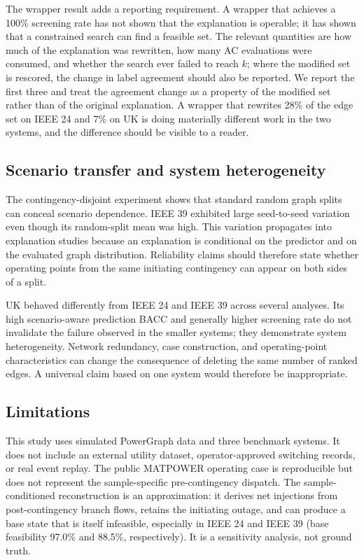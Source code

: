 The wrapper result adds a reporting requirement. A wrapper that achieves a 100\% screening rate has not shown that the explanation is operable; it has shown that a constrained search can find a feasible set. The relevant quantities are how much of the explanation was rewritten, how many AC evaluations were consumed, and whether the search ever failed to reach $k$; where the modified set is rescored, the change in label agreement should also be reported. We report the first three and treat the agreement change as a property of the modified set rather than of the original explanation. A wrapper that rewrites 28\% of the edge set on IEEE 24 and 7\% on UK is doing materially different work in the two systems, and the difference should be visible to a reader.

\subsection{Scenario transfer and system heterogeneity}\label{scenario_transfer_is_part_of_reliability_evidence}

The contingency-disjoint experiment shows that standard random graph splits can conceal scenario dependence. IEEE 39 exhibited large seed-to-seed variation even though its random-split mean was high. This variation propagates into explanation studies because an explanation is conditional on the predictor and on the evaluated graph distribution. Reliability claims should therefore state whether operating points from the same initiating contingency can appear on both sides of a split.

UK behaved differently from IEEE 24 and IEEE 39 across several analyses. Its high scenario-aware prediction BACC and generally higher screening rate do not invalidate the failure observed in the smaller systems; they demonstrate system heterogeneity. Network redundancy, case construction, and operating-point characteristics can change the consequence of deleting the same number of ranked edges. A universal claim based on one system would therefore be inappropriate.

\subsection{Limitations}\label{limitations}

This study uses simulated PowerGraph data and three benchmark systems. It does not include an external utility dataset, operator-approved switching records, or real event replay. The public MATPOWER operating case is reproducible but does not represent the sample-specific pre-contingency dispatch. The sample-conditioned reconstruction is an approximation: it derives net injections from post-contingency branch flows, retains the initiating outage, and can produce a base state that is itself infeasible, especially in IEEE 24 and IEEE 39 (base feasibility 97.0\% and 88.5\%, respectively). It is a sensitivity analysis, not ground truth.

